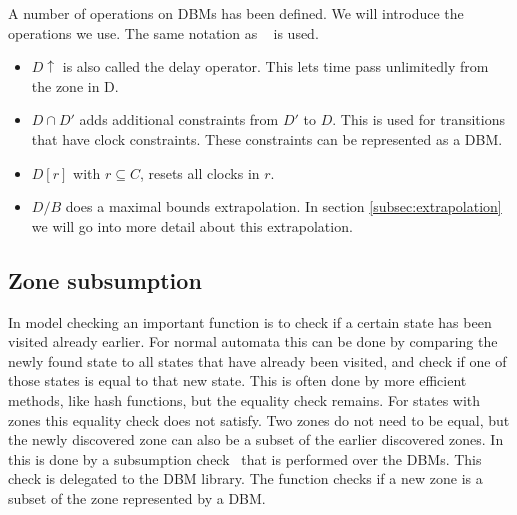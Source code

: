 A number of operations on DBMs has been defined. We will introduce the operations we use. The same notation as ~\cite{eemcs21972} is used.
\begin{itemize}
\item $D \uparrow$ is also called the delay operator. This lets time pass unlimitedly from the zone in D.
\item $D \cap D'$ adds additional constraints from $D'$ to $D$. This is used for transitions that have clock constraints. These constraints can be represented as a DBM.
\item $D[r]$ with $r \subseteq C$, resets all clocks in $r$.
\item $D/B$ does a maximal bounds extrapolation. In section \ref{subsec:extrapolation} we will go into more detail about this extrapolation.

\end{itemize}

\subsection{Zone subsumption}
\label{subsec:subsumtion}
In model checking an important function is to check if a certain state has been visited already earlier. For normal automata this can be done by comparing the newly found state to all states that have already been visited, and check if one of those states is equal to that new state. This is often done by more efficient methods, like hash functions, but the equality check remains. For states with zones this equality check does not satisfy. Two zones do not need to be equal, but the newly discovered zone can also be a subset of the earlier discovered zones. In \ltsmin{} this is done by a subsumption check~\cite{eemcs21972} that is performed over the DBMs. This check is delegated to the \uppaal{} DBM library. The function checks if a new zone is a subset of the zone represented by a DBM.